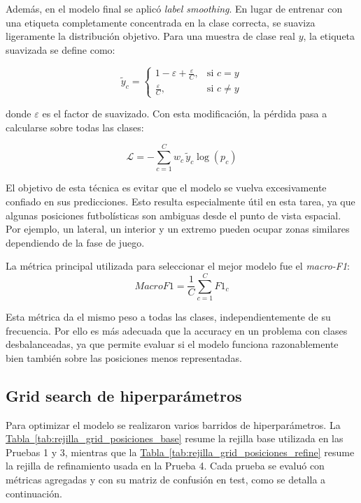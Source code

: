Además, en el modelo final se aplicó \textit{label smoothing}. En lugar de entrenar con una etiqueta completamente concentrada en la clase correcta, se suaviza ligeramente la distribución objetivo. Para una muestra de clase real \(y\), la etiqueta suavizada se define como:

\[
\tilde{y}_c =
\begin{cases}
1 - \varepsilon + \frac{\varepsilon}{C}, & \text{si } c = y \\
\frac{\varepsilon}{C}, & \text{si } c \neq y
\end{cases}
\]

donde \(\varepsilon\) es el factor de suavizado. Con esta modificación, la pérdida pasa a calcularse sobre todas las clases:

\[
\mathcal{L} =
- \sum_{c=1}^{C} w_c \, \tilde{y}_c \log(p_c)
\]

El objetivo de esta técnica es evitar que el modelo se vuelva excesivamente confiado en sus predicciones. Esto resulta especialmente útil en esta tarea, ya que algunas posiciones futbolísticas son ambiguas desde el punto de vista espacial. Por ejemplo, un lateral, un interior y un extremo pueden ocupar zonas similares dependiendo de la fase de juego.

La métrica principal utilizada para seleccionar el mejor modelo fue el \textit{macro-F1}:
\[
MacroF1 =
\frac{1}{C}
\sum_{c=1}^{C} F1_c
\]

Esta métrica da el mismo peso a todas las clases, independientemente de su frecuencia. Por ello es más adecuada que la accuracy en un problema con clases desbalanceadas, ya que permite evaluar si el modelo funciona razonablemente bien también sobre las posiciones menos representadas.


\subsection{Grid search de hiperparámetros}
\label{subsec:grid-search-posicional}

Para optimizar el modelo se realizaron varios barridos de hiperparámetros. La \hyperref[tab:rejilla_grid_posiciones_base]{Tabla~\ref*{tab:rejilla_grid_posiciones_base}} resume la rejilla base utilizada en las Pruebas 1 y 3, mientras que la \hyperref[tab:rejilla_grid_posiciones_refine]{Tabla~\ref*{tab:rejilla_grid_posiciones_refine}} resume la rejilla de refinamiento usada en la Prueba 4. Cada prueba se evaluó con métricas agregadas y con su matriz de confusión en test, como se detalla a continuación.

